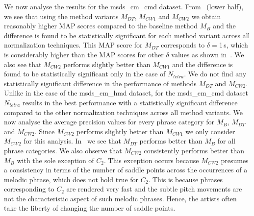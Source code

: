 We now analyse the results for the \acrshort{msds_cm_cmd} dataset. From~ (lower half), we see that using the method variants $M_{DT}$, $M_{CW1}$ and $M_{CW2}$ we obtain reasonably higher MAP scores compared to the baseline method $M_{B}$ and the difference is found to be statistically significant for each method variant across all normalization techniques. This MAP score for $M_{DT}$ corresponds to $\delta=$1\,s, which is considerably higher than the MAP scores for other $\delta$ values as shown in~. We also see that $M_{CW2}$ performs slightly better than $M_{CW1}$ and the difference is found to be statistically significant only in the case of $N_{tetra}$. We do not find any statistically significant difference in the performance of methods $M_{DT}$ and $M_{CW2}$. Unlike in the case of the \acrshort{msds_cm_hmd} dataset, for the \acrshort{msds_cm_cmd} dataset $N_{tetra}$ results in the best performance with a statistically significant difference compared to the other normalization techniques across all method variants. We now analyse the average precision values for every phrase category for $M_B$, $M_{DT}$ and $M_{CW2}$. Since $M_{CW2}$ performs slightly better than $M_{CW1}$ we only consider $M_{CW2}$ for this analysis. In~ we see that $M_{DT}$ performs better than $M_B$ for all phrase categories.  We also observe that $M_{CW2}$ consistently performs better than $M_{B}$ with the sole exception of $C_2$. This exception occurs because $M_{CW2}$ presumes a consistency in terms of the number of saddle points across the occurrences of a melodic phrase, which does not hold true for $C_2$. This is because phrases corresponding to $C_2$ are rendered very fast and the subtle pitch movements are not the characteristic aspect of such melodic phrases. Hence, the artists often take the liberty of changing the number of saddle points. 

